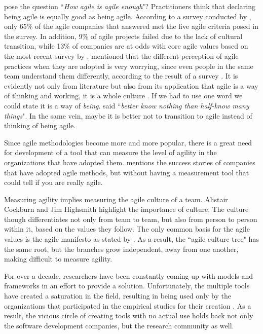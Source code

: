 \citet{comparative_agility} pose the question ``\textit{How agile is agile enough}"? Practitioners think that declaring being agile is equally good as being agile. According to a survey conducted by \citet{ambysoft}, only 65\% of the agile companies that answered met the five agile criteria posed in the survey. In addition, 9\% of agile projects failed due to the lack of cultural transition, while 13\% of companies are at odds with core agile values based on the most recent survey by \citet{versionOne}. \citet{poonacha} mentioned that the different perception of agile practices when they are adopted is very worrying, since even people in the same team understand them differently, according to the result of a survey \cite{ambler}. It is evidently not only from literature but also from its application that agile is a way of thinking and working, it is a whole culture \cite{poonacha}. If we had to use one word we could state it is a way of \textit{being}. \citet{Nietzsche} said ``\textit{better know nothing than half-know many things}". In the same vein, maybe it is better not to transition to agile instead of thinking of being agile. 

Since agile methodologies become more and more popular, there is a great need for development of a tool that can measure the level of agility in the organizations that have adopted them. \citet{sidky} mentions the success stories of companies that have adopted agile methods, but without having a measurement tool that could tell if you are really agile. 

Measuring agility implies measuring the agile culture of a team. Alistair Cockburn \cite{cockburn2002agile, Cockburn-poetry} and Jim Highsmith \cite{Highsmith:2002} highlight the importance of culture. The culture though differentiates not only from team to team, but also from person to person within it, based on the values they follow. The only common basis for the agile values is the agile manifesto\cite{beck2001agile} as stated by \citet{Ingalls}. As a result, the ``agile culture tree" has the same root, but the branches grow independent, away from one another, making difficult to measure agility.

For over a decade, researchers have been constantly coming up with models and frameworks in an effort to provide a solution. Unfortunately, the multiple tools have created a saturation in the field, resulting in being used only by the organizations that participated in the empirical studies for their creation \cite{samireh_jalali_dissertation, Jalali2014}. As a result, the vicious circle of creating tools with no actual use holds back not only the software development companies, but the research community as well.

